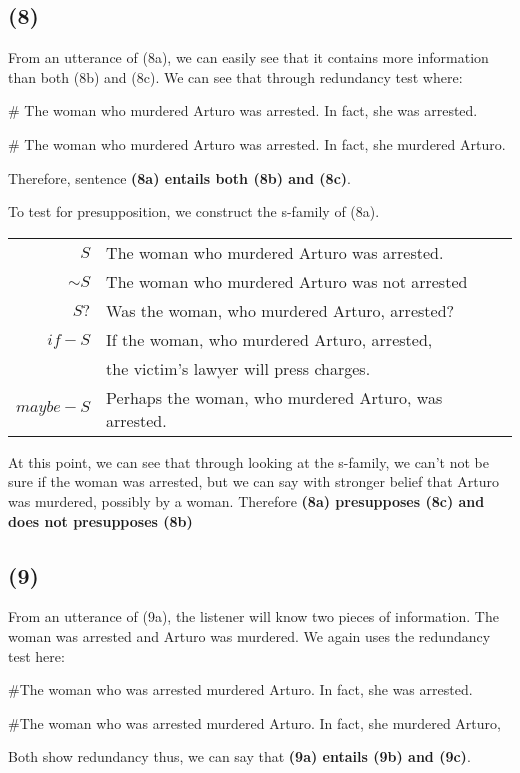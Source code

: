 \documentclass{article}
\begin{document}
\subsection*{(8)} From an utterance of (8a), we can easily see that it contains more information than both (8b) and (8c). We can see that through redundancy test where:

\# The woman who murdered Arturo was arrested. In fact, she was arrested.

\# The woman who murdered Arturo was arrested. In fact, she murdered Arturo. 

Therefore, sentence \textbf{(8a) entails both (8b) and (8c)}.

To test for presupposition, we construct the s-family of (8a).
\begin{center}
\begin{tabular}{r|l}
    $S$ & The woman who murdered Arturo was arrested. \\
    $\sim S$ & The woman who murdered Arturo was not arrested \\
    $S?$ & Was the woman, who murdered Arturo, arrested? \\
    $if-S$ & If the woman, who murdered Arturo, arrested, \\
    & the victim's lawyer will press charges. \\
    $maybe-S$ & Perhaps the woman, who murdered Arturo, was arrested.\\
\end{tabular}
\end{center}
At this point, we can see that through looking at the s-family, we can't not be sure if the woman was arrested, but we can say with stronger belief that Arturo was murdered, possibly by a woman. Therefore \textbf{(8a) presupposes (8c) and does not presupposes (8b)}

\subsection*{(9)} From an utterance of (9a), the listener will know two pieces of information. The woman was arrested and Arturo was murdered. We again uses the redundancy test here:

\#The woman who was arrested murdered Arturo. In fact, she was arrested.

\#The woman who was arrested murdered Arturo. In fact, she murdered Arturo,

Both show redundancy thus, we can say that \textbf{(9a) entails (9b) and (9c)}.
\end{document}
